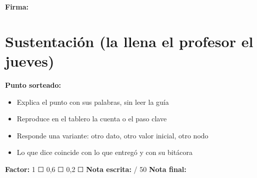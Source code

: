 \textbf{Firma:} 

\section{Sustentación (la llena el profesor el jueves)}

\textbf{Punto sorteado:} 

\begin{itemize}
\tightlist
\item[$\square$]
  Explica el punto con sus palabras, sin leer la guía
\item[$\square$]
  Reproduce en el tablero la cuenta o el paso clave
\item[$\square$]
  Responde una variante: otro dato, otro valor inicial, otro nodo
\item[$\square$]
  Lo que dice coincide con lo que entregó y con su bitácora
\end{itemize}

\textbf{Factor:} 1 ☐ 0,6 ☐ 0,2 ☐ \textbf{Nota escrita:}  / 50 \textbf{Nota final:} 


